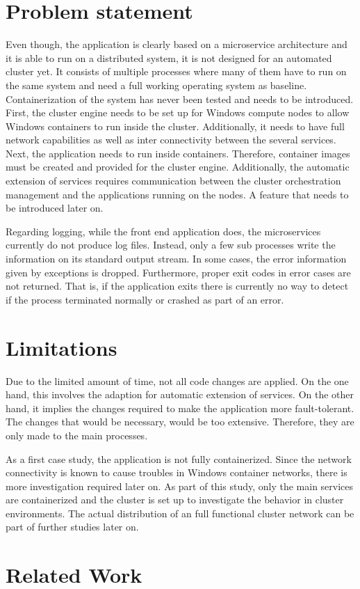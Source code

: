 \section{Problem statement}
Even though, the application is clearly based on a microservice architecture and it is able to run on a distributed system, it is not designed for an automated cluster yet.
It consists of multiple processes where many of them have to run on the same system and need a full working operating system as baseline.  %
Containerization of the system has never been tested and needs to be introduced. 
First, the cluster engine needs to be set up for \ac{Windows} compute nodes to allow \ac{Windows} containers to run inside the cluster. Additionally, it needs to have full network capabilities as well as inter connectivity between the several services.
Next, the application needs to run inside containers. Therefore, container images must be created and provided for the cluster engine. 
Additionally, the automatic extension of services requires communication between the cluster orchestration management and the applications running on the nodes. A feature that needs to be introduced later on.

Regarding logging, while the front end application does, the microservices currently do not produce log files. Instead, only a few sub processes write the information on its standard output stream. In some cases, the error information given by exceptions is dropped.
Furthermore, proper exit codes in error cases are not returned. That is, if the application exits there is currently no way to detect if the process terminated normally or crashed as part of an error.

\section{Limitations}
Due to the limited amount of time, not all code changes are applied. On the one hand, this involves the adaption for automatic extension of services. On the other hand, it implies the changes required to make the application more fault-tolerant. The changes that would be necessary, would be too extensive. Therefore, they are only made to the main processes.

As a first case study, the application is not fully containerized. Since the network connectivity is known to cause troubles in \ac{Windows} container networks, there is more investigation required later on. As part of this study, only the main services are containerized and the cluster is set up to investigate the behavior in cluster environments. The actual distribution of an full functional cluster network can be part of further studies later on.

\section{Related Work}
